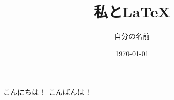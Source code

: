 \documentclass[a4paper, 9pt]{jarticle}
\title{私と\LaTeX}
\author{自分の名前}
\date{\today}
\begin{document}
\maketitle
こんにちは！
こんばんは！
\end{document}
